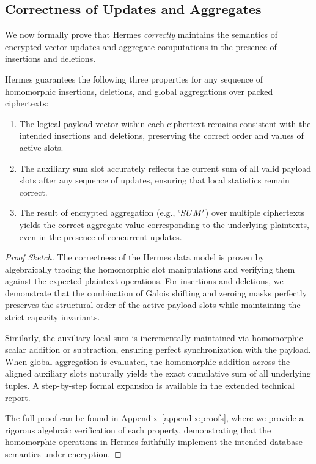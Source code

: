 \documentclass[sigconf,nonacm]{acmart}
\begin{document}
\subsection{Correctness of Updates and Aggregates}

We now formally prove that Hermes \emph{correctly} maintains the semantics of encrypted vector updates and aggregate computations in the presence of insertions and deletions. 

\begin{theorem}
  Hermes guarantees the following three properties for any sequence of homomorphic insertions, deletions, and global aggregations over packed ciphertexts:
  \begin{enumerate}
    \item The logical payload vector within each ciphertext remains consistent with the intended insertions and deletions, preserving the correct order and values of active slots.
    \item The auxiliary sum slot accurately reflects the current sum of all valid payload slots after any sequence of updates, ensuring that local statistics remain correct.
    \item The result of encrypted aggregation (e.g., $`SUM'$) over multiple ciphertexts yields the correct aggregate value corresponding to the underlying plaintexts, even in the presence of concurrent updates.
  \end{enumerate}
\end{theorem}

\begin{proof}[Proof Sketch]
The correctness of the Hermes data model is proven by algebraically tracing the homomorphic slot manipulations and verifying them against the expected plaintext operations. For insertions and deletions, we demonstrate that the combination of Galois shifting and zeroing masks perfectly preserves the structural order of the active payload slots while maintaining the strict capacity invariants. 

Similarly, the auxiliary local sum is incrementally maintained via homomorphic scalar addition or subtraction, ensuring perfect synchronization with the payload. When global aggregation is evaluated, the homomorphic addition across the aligned auxiliary slots naturally yields the exact cumulative sum of all underlying tuples. A step-by-step formal expansion is available in the extended technical report.

The full proof can be found in Appendix~\ref{appendix:proofs}, where we provide a rigorous algebraic verification of each property, demonstrating that the homomorphic operations in Hermes faithfully implement the intended database semantics under encryption.
\end{proof}
\end{document}
